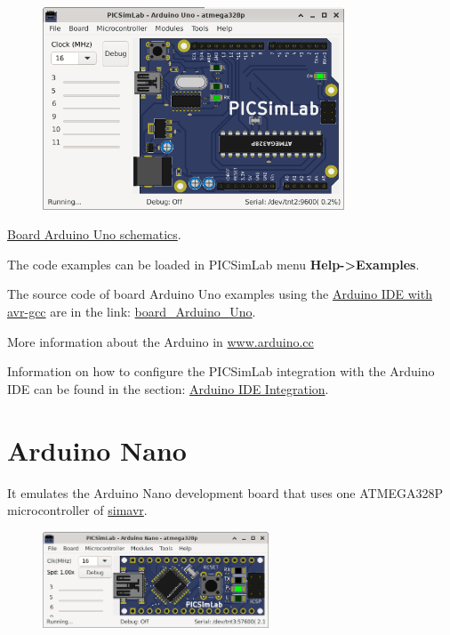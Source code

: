 \begin{figure}[H]
\center
\includegraphics[width=0.80\textwidth]{img/picsimlab5.png} 
\end{figure} 

\href{https://www.arduino.cc/en/uploads/Main/Arduino_Uno_Rev3-schematic.pdf}{Board Arduino Uno schematics}.\vspace{0.5cm}

The code examples can be loaded in PICSimLab menu \textbf{Help->Examples}.

The source code of board Arduino Uno examples using the 
\href{https://www.arduino.cc/en/Main/Software}{Arduino IDE with avr-gcc} are in the link: 
\href{https://lcgamboa.github.io/picsimlab_examples/board_Arduino_Uno.html}{board\_Arduino\_Uno}.

More information about the Arduino in \href{https://www.arduino.cc/}{www.arduino.cc}

Information on how to configure the PICSimLab integration with the Arduino IDE can be found in the 
section: \hyperlink{def:arduinoide}{Arduino IDE Integration}.

\section{Arduino Nano}

It emulates the Arduino Nano development board that uses one ATMEGA328P microcontroller of \href{https://github.com/buserror/simavr}{simavr}.

\begin{figure}[H]
\center
\includegraphics[width=0.60\textwidth]{img/boardANano.png} 
\end{figure} 

